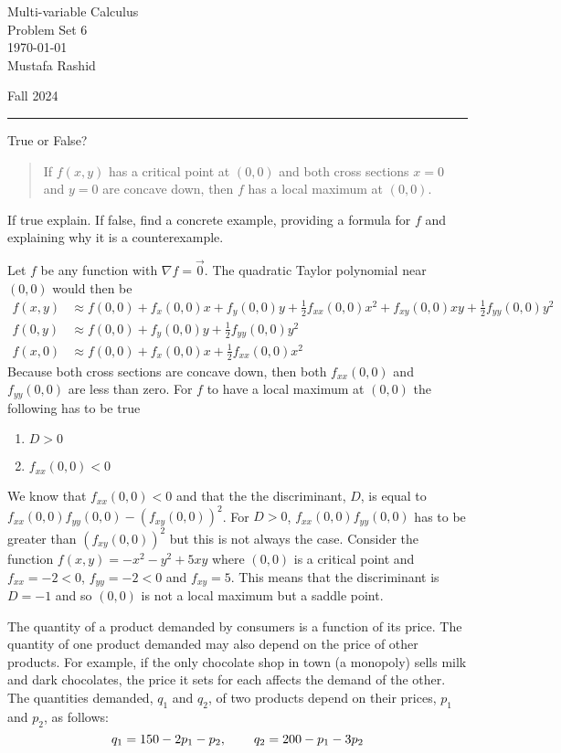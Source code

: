 \documentclass[12pt,letterpaper, onecolumn]{exam}
\begin{document}
	
	\begingroup  
	\centering
	\LARGE Multi-variable Calculus\\
	\LARGE Problem Set 6\\[0.5em]
	\large \today\\[0.5em]
	\large Mustafa Rashid\par
	\large Fall 2024\par
	\endgroup
	\rule{\textwidth}{0.4pt}
	\pointsdroppedatright
	\printanswers
	\renewcommand{\solutiontitle}{\noindent\textbf{Ans:}\enspace}  
	
	
	
	\begin{questions}
		
		\question True or False?
		\begin{quote}
			If $f(x,y)$ has a critical point at $(0,0)$ and both cross sections $x=0$ and $y=0$ are concave down, then $f$ has a local maximum at $(0,0)$.
		\end{quote}
		If true explain. If false, find a concrete example, providing a formula for $f$ and explaining why it is a counterexample.

		\begin{solution}
			Let $f$ be any function with $\nabla f=\vec{0}$. The quadratic Taylor polynomial near $(0,0)$ would then be 
			\begin{align*}
				f(x,y)&\approx f(0,0)+f_x(0,0)x+f_y(0,0)y+\frac{1}{2}f_{xx}(0,0)x^2+f_{xy}(0,0)xy+\frac{1}{2}f_{yy}(0,0)y^2\\
				f(0,y)&\approx f(0,0)+f_y(0,0)y+\frac{1}{2}f_{yy}(0,0)y^2\tag{Cross section where $x=0$}\\
				f(x,0)&\approx f(0,0)+f_x(0,0)x+\frac{1}{2}f_{xx}(0,0)x^2\tag{Cross section where $y=0$}
			\end{align*}
			Because both cross sections are concave down, then both $f_{xx}(0,0)$ and $f_{yy}(0,0)$ are less than zero. For $f$ to have a local maximum at $(0,0)$ the following has to be true
			\begin{enumerate}
				\item $D>0$
				\item $f_{xx}(0,0)<0$
			\end{enumerate}
			We know that $f_{xx}(0,0)<0$ and that the the discriminant, $D$, is equal to $f_{xx}(0,0)f_{yy}(0,0)-\left(f_{xy}(0,0)\right)^2$. For $D>0$, $f_{xx}(0,0)f_{yy}(0,0)$ has to be greater than $\left(f_{xy}(0,0)\right)^2$ but this is not always the case. Consider the function $f(x,y)=-x^2-y^2+5xy$ where $(0,0)$ is a critical point and $f_{xx}=-2<0$, $f_{yy}=-2<0$ and $f_{xy}=5$. This means that the discriminant is $D=-1$ and so $(0,0)$ is not a local maximum but a saddle point.
		\end{solution}
	\question The quantity of a product demanded by consumers is a function of its price. The quantity of one product demanded may also depend on the price of other products. For example, if the only chocolate shop in town (a monopoly) sells milk and dark chocolates, the price it sets for each affects the demand of the other. The quantities demanded, $q_1$ and $q_2$, of two products depend on their prices, $p_1$ and $p_2$, as follows: 
	$$q_1=150-2p_1-p_2,\hspace*{0.75cm}q_2=200-p_1-3p_2$$
	\begin{parts}

\end{parts}
\end{questions}
\end{document}
